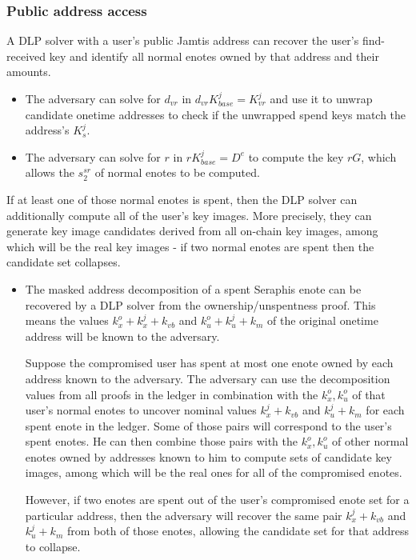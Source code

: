 \subsubsection{Public address access}
\label{subsubsec:jamtis-forward-secrecy-address-access}

A DLP solver with a user's public Jamtis address can recover the user's find-received key and identify all normal enotes owned by that address and their amounts.
\begin{itemize}
    \item The adversary can solve for $d_{vr}$ in $d_{vr} K^j_{base} = K^j_{vr}$ and use it to unwrap candidate onetime addresses to check if the unwrapped spend keys match the address's $K^j_s$.

    \item The adversary can solve for $r$ in $r K^j_{base} = D^e$ to compute the key $r G$, which allows the $s^{sr}_2$ of normal enotes to be computed.
\end{itemize}

If at least one of those normal enotes is spent, then the DLP solver can additionally compute all of the user's key images. More precisely, they can generate key image candidates derived from all on-chain key images, among which will be the real key images - if two normal enotes are spent then the candidate set collapses.
\begin{itemize}
    \item The masked address decomposition of a spent Seraphis enote can be recovered by a DLP solver from the ownership/unspentness proof. This means the values $k^o_x + k^j_x + k_{vb}$ and $k^o_u + k^j_u + k_m$ of the original onetime address will be known to the adversary.

    Suppose the compromised user has spent at most one enote owned by each address known to the adversary. The adversary can use the decomposition values from all proofs in the ledger in combination with the $k^o_x, k^o_u$ of that user's normal enotes to uncover nominal values $k^j_x + k_{vb}$ and $k^j_u + k_m$ for each spent enote in the ledger. Some of those pairs will correspond to the user's spent enotes. He can then combine those pairs with the $k^o_x, k^o_u$ of other normal enotes owned by addresses known to him to compute sets of candidate key images, among which will be the real ones for all of the compromised enotes.

    However, if two enotes are spent out of the user's compromised enote set for a particular address, then the adversary will recover the same pair $k^j_x + k_{vb}$ and $k^j_u + k_m$ from both of those enotes, allowing the candidate set for that address to collapse.
\end{itemize}

